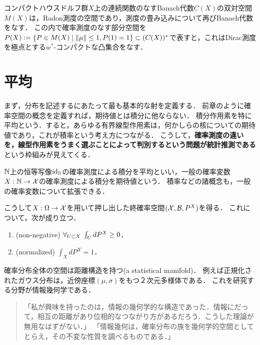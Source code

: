\documentclass[uplatex,dvipdfmx]{jsreport}
\begin{document}
\begin{notation}
    コンパクトハウスドルフ群$X$上の連続関数のなすBanach代数$C(X)$の双対空間$M(X)$は，Radon測度の空間であり，測度の畳み込みについて再びBanach代数をなす．
    この内で確率測度のなす部分空間を$P(X):=\left\{P\in M(X)\mid \|\mu\|\le 1,P(1)=1\right\}\subset(C(X))^*$で表すと，これはDirac測度を極点とする$w^*$-コンパクトな凸集合をなす．
\end{notation}

\section{平均}

\begin{tcolorbox}[colframe=ForestGreen, colback=ForestGreen!10!white,breakable,colbacktitle=ForestGreen!40!white,coltitle=black,fonttitle=\bfseries\sffamily,
title=まさか，確率空間とは構造の入った多様体か．「観測」と「座標変換」の構造を持つ，極めて幾何的なsetupである．]
    まず，分布を記述するにあたって最も基本的な射を定義する．
    前章のように確率空間の概念を定義すれば，期待値とは積分に他ならない．
    積分作用素を特に平均という．すると，あらゆる有界線型作用素は，何かしらの核についての期待値であり，これが積率という考え方につながる．
    こうして，\textbf{確率測度の違いを，線型作用素をうまく選ぶことによって判別するという問題が統計推測である}という枠組みが見えてくる．

    $\mathbb{N}$上の恒等写像$\mathrm{id}_{\mathbb{N}}$の確率測度による積分を平均といい，一般の確率変数$X:\mathbb{N}\to\mathcal{X}$の確率測度による積分を期待値という．
    積率などの諸概念も，一般の確率変数について拡張できる．
\end{tcolorbox}

\begin{lemma}[確率分布の特徴付け]
    こうして$X:\Omega\to\mathcal{X}$を用いて押し出した終確率空間$(\mathcal{X},\mathcal{B},P^X)$を得る．
    これについて，次が成り立つ．
    \begin{enumerate}
        \item (non-negative) $\forall_{U\subset\mathcal{X}}\;\int_UdP^X\ge 0$．
        \item (normalized) $\int_XdP^X=1$．
    \end{enumerate}
\end{lemma}
\begin{remarks}
    確率分布全体の空間は距離構造を持つ(a statistical manifold)．
    例えば正規化されたガウス分布は，近傍座標$(\mu,\sigma)$をもつ２次元多様体である．
    これを研究する分野が情報幾何学である．
    \begin{quote}
        「私が興味を持ったのは，情報の幾何学的な構造であった．情報にだって，相互の距離があり位相的なつながり方があるだろう．こうした理論が無用なはずがない．」
        「情報幾何は，確率分布の族を幾何学的空間としてとらえ，その不変な性質を調べるものである．」
    \end{quote}
\end{remarks}
\end{document}
